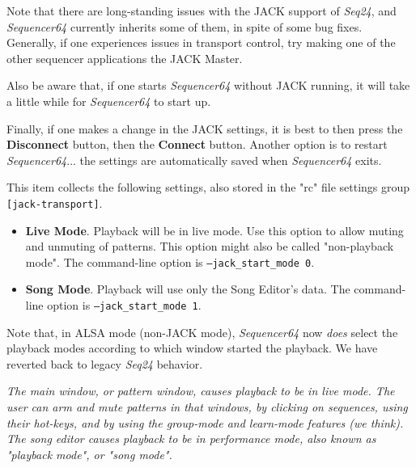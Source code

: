    Note that there are long-standing issues with the JACK support of
   \textsl{Seq24}, and \textsl{Sequencer64} currently inherits some of them,
   in spite of some bug fixes.  Generally, if one experiences issues in
   transport control, try making one of the other sequencer applications the
   JACK Master.

   Also be aware that, if one starts \textsl{Sequencer64} without JACK running,
   it will take a little while for \textsl{Sequencer64} to start up.

   Finally, if one makes a change in the JACK settings, it is best to
   then press the \textbf{Disconnect} button, then the \textbf{Connect}
   button.  Another option is to restart \textsl{Sequencer64}... the settings
   are automatically saved when \textsl{Sequencer64} exits.

   This item collects the following settings, also stored in the "rc" file
   settings group \texttt{[jack-transport]}.

   \begin{itemize}
      \item \textbf{Live Mode}.
         Playback will be in live mode.  Use this option to allow muting and
         unmuting of patterns.  This option might also be called "non-playback
         mode".
         The command-line option is \texttt{--jack\_start\_mode 0}.
      \item \textbf{Song Mode}.
         Playback will use only the Song Editor's data.
         The command-line option is \texttt{--jack\_start\_mode 1}.
   \end{itemize}

   Note that, in ALSA mode (non-JACK mode), \textsl{Sequencer64} 
   now \textsl{does} select the playback modes
   according to which window started the playback.
   We have reverted back to legacy \textsl{Seq24} behavior.
   
   \textsl{The main window, or pattern
   window, causes playback to be in live mode.  The user can arm and mute
   patterns in that windows, by clicking on sequences, using their hot-keys,
   and by using the group-mode and learn-mode features (we think).
   The song editor causes playback to be in performance mode, also known as
   "playback mode", or "song mode".}

